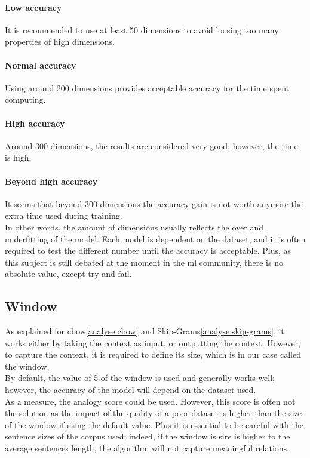 \paragraph{Low accuracy}
It is recommended to use at least 50 dimensions to avoid loosing too many properties of high dimensions.

\paragraph{Normal accuracy}
Using around 200 dimensions provides acceptable accuracy for the time spent computing.

\paragraph{High accuracy}
Around 300 dimensions, the results are considered very good; however, the time is high.

\paragraph{Beyond high accuracy}
It seems that beyond 300 dimensions the accuracy gain is not worth anymore the extra time used during training.\\

In other words, the amount of dimensions usually reflects the over and underfitting of the model. Each model is dependent on the dataset, and it is often required to test the different number until the accuracy is acceptable. Plus, as this subject is still debated at the moment in the \gls{ml} community, there is no absolute value, except try and fail.


\subsection{Window}
\label{analyse:window}
As explained for \gls{cbow}\ref{analyse:cbow} and Skip-Grams\ref{analyse:skip-grams}, it works either by taking the context as input, or outputting the context. However, to capture the context, it is required to define its size, which is in our case called the window.\\

By default, the value of  5 of the window is used and generally works well; however, the accuracy of the model will depend on the dataset used.\\

As a measure, the analogy score could be used. However, this score is often not the solution as the impact of the quality of a poor dataset is higher than the size of the window if using the default value. Plus it is essential to be careful with the sentence sizes of the corpus used; indeed, if the window is sire is higher to the average sentences length, the algorithm will not capture meaningful relations. \\

